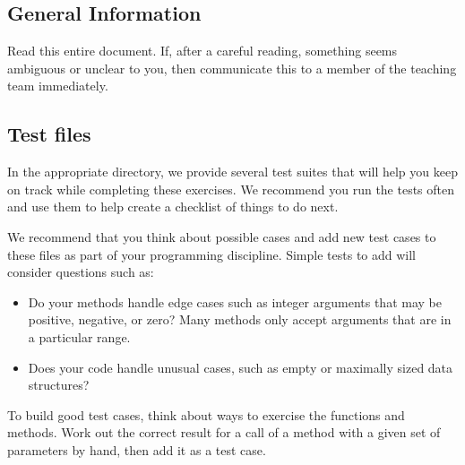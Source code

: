 \documentclass[12pt,a4paper]{exam}
\begin{document}
\subsection*{General Information}

Read this entire document. If, after a careful reading, something seems ambiguous or unclear to you, 
then communicate this to a member of the teaching team immediately.

\subsection*{Test files}

In the appropriate directory, we provide several test suites that will 
help you keep on track while completing these exercises. 
We recommend you run the tests often and use them to help create a checklist of things to do next.

We recommend that you think about possible cases and add new test cases to these 
files as part of your programming discipline. Simple tests to add will consider questions such as:
\begin{itemize}
	\item Do your methods handle edge cases such as integer arguments that may be positive, 
	negative, or zero? Many methods only accept arguments that are in a particular range.
	\item Does your code handle unusual cases, such as empty or maximally sized data structures?	
\end{itemize}
To build good test cases, think about ways to exercise the functions and methods. 
Work out the correct result for a call of a method with a given set of parameters by hand, 
then add it as a test case.
\end{document}

